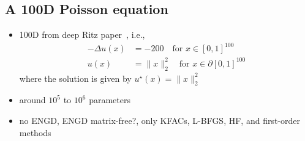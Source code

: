\subsection{A 100D Poisson equation}

\begin{itemize}
\item 100D from deep Ritz paper~\citep{yu2018deep}, i.e.,
  \begin{align*}
    -\Delta u(x) & = -200 \quad \text{for } x\in [0,1]^{100} \\
    u(x) & = \lVert x \rVert_2^2 \quad \text{for } x\in \partial[0,1]^{100}
  \end{align*}
  where the solution is given by $u^\star(x) = \lVert x \rVert_2^2$
\item around $10^5$ to $10^6$ parameters
\item no ENGD, ENGD matrix-free?, only KFACs, L-BFGS, HF, and first-order methods
\end{itemize}

